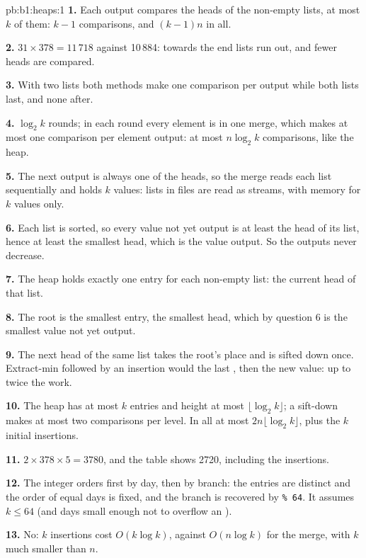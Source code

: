 \begin{solution}{pb:b1:heaps:1}
\textbf{1.} Each output compares the heads of the non-empty lists, at most $k$ of them: $k - 1$ comparisons, and $(k -
1)n$ in all.

\textbf{2.} $31 \times 378 = 11\,718$ against 10\,884: towards the end lists run out, and fewer heads are compared.

\textbf{3.} With two lists both methods make one comparison per output while both lists last, and none after.

\textbf{4.} $\log_2 k$ rounds; in each round every element is in one merge, which makes at most one comparison per
element output: at most $n \log_2 k$ comparisons, like the heap.

\textbf{5.} The next output is always one of the heads, so the merge reads each list sequentially and holds $k$ values:
lists in files are read as streams, with memory for $k$ values only.

\textbf{6.} Each list is sorted, so every value not yet output is at least the head of its list, hence at least the
smallest head, which is the value output. So the outputs never decrease.

\textbf{7.} The heap holds exactly one entry for each non-empty list: the current head of that list.

\textbf{8.} The root is the smallest entry, the smallest head, which by question 6 is the smallest value not yet output.

\textbf{9.} The next head of the same list takes the root's place and is sifted down once. Extract-min followed by an
insertion would  the last , then  the new value: up to twice the work.

\textbf{10.} The heap has at most $k$ entries and height at most $\lfloor \log_2 k \rfloor$; a sift-down makes at most
two comparisons per level. In all at most $2n \lfloor \log_2 k \rfloor$, plus the $k$ initial insertions.

\textbf{11.} $2 \times 378 \times 5 = 3780$, and the table shows 2720, including the insertions.

\textbf{12.} The integer orders first by day, then by branch: the entries are distinct and the order of equal days is
fixed, and the branch is recovered by \texttt{\% 64}. It assumes $k \leq 64$ (and days small enough not to overflow an
).

\textbf{13.} No: $k$ insertions cost $O(k \log k)$, against $O(n \log k)$ for the merge, with $k$ much smaller than $n$.


\end{solution}
